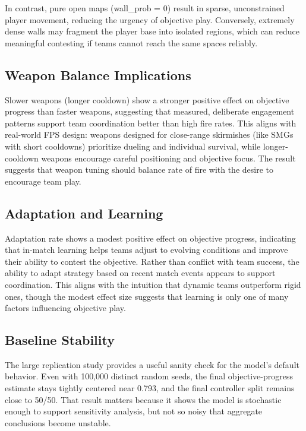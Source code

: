 \documentclass{assignment}
\begin{document}
In contrast, pure open maps (wall\_prob = 0) result in sparse, unconstrained player movement, reducing the urgency of objective play. Conversely, extremely dense walls may fragment the player base into isolated regions, which can reduce meaningful contesting if teams cannot reach the same spaces reliably.

\subsection{Weapon Balance Implications}

Slower weapons (longer cooldown) show a stronger positive effect on objective progress than faster weapons, suggesting that measured, deliberate engagement patterns support team coordination better than high fire rates. This aligns with real-world FPS design: weapons designed for close-range skirmishes (like SMGs with short cooldowns) prioritize dueling and individual survival, while longer-cooldown weapons encourage careful positioning and objective focus. The result suggests that weapon tuning should balance rate of fire with the desire to encourage team play.

\subsection{Adaptation and Learning}

Adaptation rate shows a modest positive effect on objective progress, indicating that in-match learning helps teams adjust to evolving conditions and improve their ability to contest the objective. Rather than conflict with team success, the ability to adapt strategy based on recent match events appears to support coordination. This aligns with the intuition that dynamic teams outperform rigid ones, though the modest effect size suggests that learning is only one of many factors influencing objective play.

\subsection{Baseline Stability}

The large replication study provides a useful sanity check for the model's default behavior. Even with 100,000 distinct random seeds, the final objective-progress estimate stays tightly centered near 0.793, and the final controller split remains close to 50/50. That result matters because it shows the model is stochastic enough to support sensitivity analysis, but not so noisy that aggregate conclusions become unstable.
\end{document}
